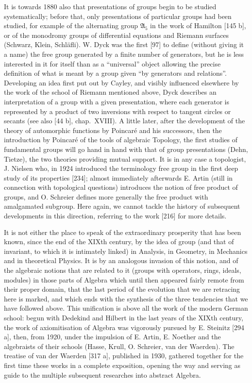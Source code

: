 It is towards 1880 also that presentations of groups begin to be studied systematically; before that, only presentations of particular groups had been studied, for example of the alternating group \(\mathfrak{A}_5\) in the work of Hamilton {[}145 b{]}, or of the monodromy groups of differential equations and Riemann surfaces (Schwarz, Klein, Schläfli). W. Dyck was the first {[}97{]} to define (without giving it a name) the free group generated by a finite number of generators, but he is less interested in it for itself than as a ``universal'' object allowing the precise definition of what is meant by a group given ``by generators and relations''. Developing an idea first put out by Cayley, and visibly influenced elsewhere by the work of the school of Riemann mentioned above, Dyck describes an interpretation of a group with a given presentation, where each generator is represented by a product of two inversions with respect to tangent circles or secants (see also {[}44 b{]}, chap.~XVIII). A little later, after the development of the theory of automorphic functions by Poincaré and his successors, then the introduction by Poincaré of the tools of algebraic Topology, the first studies of fundamental groups will go hand in hand with that of group presentations (Dehn, Tietze), the two theories providing mutual support. It is in any case a topologist, J. Nielsen who, in 1924 introduced the terminology free group in the first deep study of its properties {[}234{]}; almost immediately afterwards E. Artin (still in connection with topological questions) introduces the notion of free product of groups, and O. Schreier defines more generally the free product with amalgamated subgroup. Here again, we cannot tackle the history of subsequent developments in this direction, referring to the work {[}216{]} for more details.

It is not either the place to speak of the extraordinary prosperity that has been known, since the end of the XIXth century, by the idea of group (and that of invariant, to which it is intimately linked) in Analysis, in Geometry, in Mechanics and in theoretical Physics. It is by an analogous invasion of this notion, and of the algebraic notions that are related to it (groups with operators, rings, ideals, modules) in those parts of Algebra which until then appeared fairly remote from their proper domain, that the last period of the evolution that we are retracing here is marked, and which ends with the synthesis of the three tendencies that we have followed above. This unification is above all the work of the modern German school: begun with Dedekind and Hilbert in the last years of the XIXth century, the work of axiomitisation of Algebra was vigorously pursued by E. Steinitz {[}294 a{]}, then, from 1920, under the impulsion of E. Artin, E. Noether and the algebraists of their schools (Hasse, Krull, O. Schreier, van der Waerden). The treatise of van der Waerden {[}317 a{]}, published in 1930, gathered together for the first time these works in a complete exposition, opening the way and serving as guide to the multiple subsequent researches into abstract Algebra.
\relax{}
